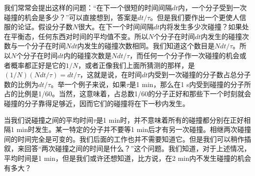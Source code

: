 我们常常会提出这样的问题：“在下一个很短的时间间隔$dt$内，一个分子受到一次碰撞的机会是多少？”可以直接想到，答案是$dt/\tau$。但是我们要作出一个更使人信服的论证。假设分子数$N$很大。在下一个时间间隔$dt$内将发生多少次碰撞？如果处在平衡态，任何东西对时间的平均值不变。所以$N$个分子在时间$dt$内发生的碰撞次数与一个分子在时间$N dt$内发生的碰撞次数相同。我们知道这个数目是$Ndt/\tau$。所以$N$个分子在时间$dt$内的碰撞次数是$Ndt/\tau$，而任何一个分子作一次碰撞的机会或者概率都正好是它的$1/N$，或者正像我们上面所猜测的那样，是$(1/N)(N dt /\tau)=dt/\tau$，这就是说，在时间$dt$内受到一次碰撞的分子数占总分子数的比例为$dt /\tau$。举一个例子来说，如果$\tau$是1 min，那么在1 s内受到碰撞的分子所占的比例是1/60。当然，这意味着，占总数1/60的分子正好和那些下一个时刻就会碰撞的分子靠得足够近，因而它们的碰撞将在下一秒内发生。

当我们说碰撞之间的平均时间$\tau$是1 min时，并不意味着所有的碰撞都分别在正好相隔1 min时发生。某一特定的分子并不要等1 min后才有另一次碰撞。相继两次碰撞间的时间完全是可变的。我们后面的工作也并不需要知道它。但是我们可以稍作插叙，来回答“两次碰撞之间的时间是什么？”这个问题。我们知道，对于上述情况，平均时间是1 min，但是我们或许还想知道，比方说，在2 min内不发生碰撞的机会有多大？

